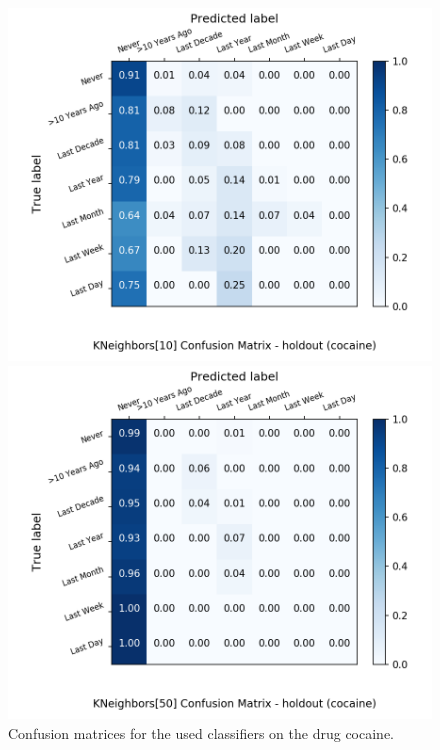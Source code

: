 \begin{figure}[H]
\begin{minipage}[b]{0.32\textwidth}
		\includegraphics[width=1.1\textwidth]{Plots/drugs/cocaine_KNeighbors_10_balance_False_holdout.png}
  \end{minipage}
	\begin{minipage}[b]{0.32\textwidth}
		\includegraphics[width=1.1\textwidth]{Plots/drugs/cocaine_KNeighbors_50_balance_False_holdout.png}
  \end{minipage}
	\caption{Confusion matrices for the used classifiers on the drug cocaine.}
\end{figure}

